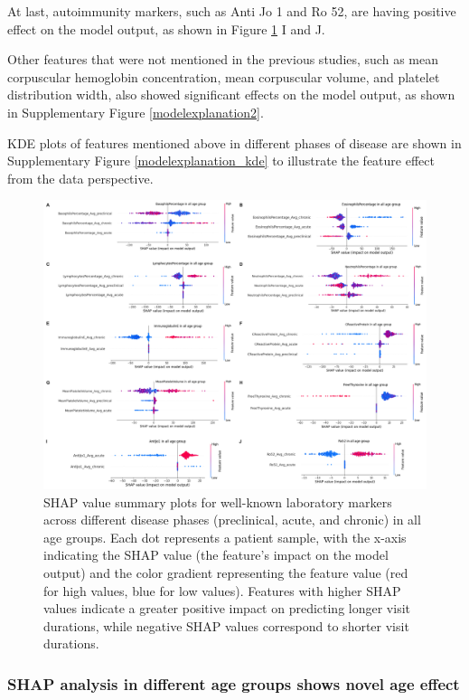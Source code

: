 \documentclass[final,3p,times,authoryear]{elsarticle}
\begin{document}
At last, autoimmunity markers, such as Anti Jo 1 and Ro 52, are having positive effect on the model output, as shown in Figure \ref{modelexplanation} I and J.

Other features that were not mentioned in the previous studies, such as mean corpuscular hemoglobin concentration, mean corpuscular volume, and platelet distribution width, also showed significant effects on the model output, as shown in Supplementary Figure \ref{modelexplanation2}.

KDE plots of features mentioned above in different phases of disease are shown in Supplementary Figure \ref{modelexplanation_kde} to illustrate the feature effect from the data perspective.

\begin{figure}[t] 
    \centering
    \includegraphics[width=0.8\linewidth]{figures/modelexplanation.png} 
    \caption{SHAP value summary plots for well-known laboratory markers across different disease phases (preclinical, acute, and chronic) in all age groups. Each dot represents a patient sample, with the x-axis indicating the SHAP value (the feature’s impact on the model output) and the color gradient representing the feature value (red for high values, blue for low values). Features with higher SHAP values indicate a greater positive impact on predicting longer visit durations, while negative SHAP values correspond to shorter visit durations.}\label{modelexplanation}
\end{figure}


\subsubsection{SHAP analysis in different age groups shows novel age effect}
\end{document}
